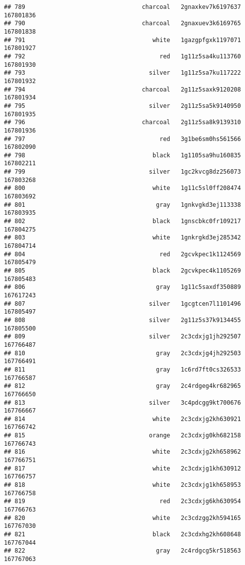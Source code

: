 \documentclass[
]{article}
\begin{document}
\begin{verbatim}
## 789                                 charcoal   2gnaxkev7k6197637 167801836
## 790                                 charcoal   2gnaxuev3k6169765 167801838
## 791                                    white   1gazgpfgxk1197071 167801927
## 792                                      red   1g11z5sa4ku113760 167801930
## 793                                   silver   1g11z5sa7ku117222 167801932
## 794                                 charcoal   2g11z5saxk9120208 167801934
## 795                                   silver   2g11z5sa5k9140950 167801935
## 796                                 charcoal   2g11z5sa8k9139310 167801936
## 797                                      red   3g1be6sm0hs561566 167802090
## 798                                    black   1g1105sa9hu160835 167802211
## 799                                   silver   1gc2kvcg8dz256073 167803268
## 800                                    white   1g11c5sl0ff208474 167803692
## 801                                     gray   1gnkvgkd3ej113338 167803935
## 802                                    black   1gnscbkc0fr109217 167804275
## 803                                    white   1gnkrgkd3ej285342 167804714
## 804                                      red   2gcvkpec1k1124569 167805479
## 805                                    black   2gcvkpec4k1105269 167805483
## 806                                     gray   1g11c5saxdf350889 167617243
## 807                                   silver   1gcgtcen7l1101496 167805497
## 808                                   silver   2g11z5s37k9134455 167805500
## 809                                   silver   2c3cdxjg1jh292507 167766487
## 810                                     gray   2c3cdxjg4jh292503 167766491
## 811                                     gray   1c6rd7ft0cs326533 167766587
## 812                                     gray   2c4rdgeg4kr682965 167766650
## 813                                   silver   3c4pdcgg9kt700676 167766667
## 814                                    white   2c3cdxjg2kh630921 167766742
## 815                                   orange   2c3cdxjg0kh682158 167766743
## 816                                    white   2c3cdxjg2kh658962 167766751
## 817                                    white   2c3cdxjg1kh630912 167766757
## 818                                    white   2c3cdxjg1kh658953 167766758
## 819                                      red   2c3cdxjg6kh630954 167766763
## 820                                    white   2c3cdzgg2kh594165 167767030
## 821                                    black   2c3cdxhg2kh608648 167767044
## 822                                     gray   2c4rdgcg5kr518563 167767063

\end{verbatim}
\end{document}
